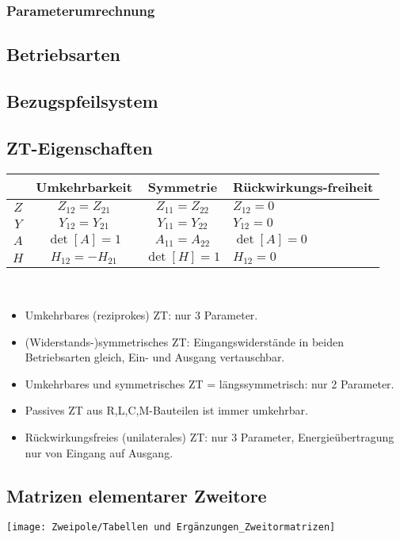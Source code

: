 \subsubsection{Parameterumrechnung}


\subsection{Betriebsarten}

\subsection{Bezugspfeilsystem}

\subsection{ZT-Eigenschaften}
\small
\begin{tabularx}{0.85\columnwidth}{|c|c|c|X|}
	\hline
	& Umkehrbarkeit & Symmetrie & Rückwirkungs-freiheit\\
	\hline\hline
	$Z$&  $Z_{12} = Z_{21}$ & $Z_{11} = Z_{22}$ & $Z_{12} = 0$\\
	\hline
	$Y$&  $Y_{12} = Y_{21}$& $Y_{11} = Y_{22}$ & $Y_{12 } = 0$ \\
	\hline
	$A$&  $\operatorname{det}[A] = 1$& $A_{11} = A_{22}$ & $\operatorname{det}[A] = 0$\\
	\hline
	$H$&  $H_{12} = -H_{21}$& $\operatorname{det}[H]=1$ & $H_{12} = 0$ \\
	\hline
\end{tabularx}\\
\begin{itemize}[leftmargin=*]
	\item Umkehrbares (reziprokes) ZT: nur 3 Parameter.
	\item (Widerstands-)symmetrisches ZT: Eingangswiderstände in beiden Betriebsarten gleich, Ein- und Ausgang vertauschbar.
	\item Umkehrbares und symmetrisches ZT = längssymmetrisch: nur 2 Parameter.
	\item Passives ZT aus R,L,C,M-Bauteilen ist immer umkehrbar.
	\item Rückwirkungsfreies (unilaterales) ZT: nur 3 Parameter, Energieübertragung nur von Eingang auf Ausgang.
\end{itemize}
\clearpage
\begin{samepage}
    \subsection{Matrizen elementarer Zweitore}
    \begin{center}
    	\texttt{[image: Zweipole/Tabellen und Ergänzungen\_Zweitormatrizen]}
    \end{center}
\end{samepage}
\clearpage

